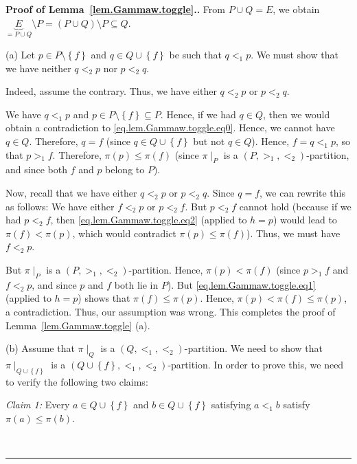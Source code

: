 \documentclass[numbers=enddot,12pt,final,onecolumn,notitlepage,abstracton]{scrartcl}%
\theoremstyle{definition}
\newenvironment{proof}[1][Proof]{\noindent\textbf{#1.} }{\ \rule{0.5em}{0.5em}}
\begin{document}
\begin{proof}[Proof of Lemma~\ref{lem.Gammaw.toggle}.]From
$P \cup Q = E$, we obtain $\underbrace{E}_{= P \cup Q}
\setminus P = \left(P \cup Q\right) \setminus P \subseteq Q$.

(a) Let $p \in P \setminus \left\{f\right\}$
and $q \in Q \cup \left\{f\right\}$ be such that
$q <_1 p$. We must show that we have neither $q <_2 p$ nor $p <_2 q$.

Indeed, assume the contrary. Thus, we have
either $q <_2 p$ or $p <_2 q$.

We have $q <_{1} p$ and
$p\in P\setminus\left\{  f\right\}  \subseteq P$. Hence, if we had $q\in Q$,
then we would obtain a contradiction to
\eqref{eq.lem.Gammaw.toggle.eq0}. Hence, we cannot have $q\in Q$.
Therefore, $q=f$ (since $q\in Q\cup\left\{  f\right\}  $ but not $q\in Q$).
Hence, $f=q<_{1}p$, so that $p>_{1}f$. Therefore, $\pi\left(  p\right)
\leq\pi\left(  f\right)  $ (since $\pi\mid_{P}$ is a
$\left(  P,>_{1},<_{2}\right)  $-partition, and since both $f$
and $p$ belong to $P$).

Now, recall that we have either $q <_2 p$ or $p <_2 q$.
Since $q = f$, we can rewrite this as follows:
We have either $f <_2 p$ or $p <_2 f$.
But $p<_{2}f$ cannot hold (because if we had $p<_{2}f$, then
\eqref{eq.lem.Gammaw.toggle.eq2} (applied to $h=p$) would lead to
$\pi\left(  f\right)  <\pi\left(  p\right)  $, which would contradict
$\pi\left(  p\right)  \leq\pi\left(  f\right)  $).
Thus, we must have $f<_{2}p$.

But $\pi\mid_{P}$ is a $\left(  P,>_{1},<_{2}\right)  $-partition. Hence,
$\pi\left(  p\right)  <\pi\left(  f\right)  $ (since $p>_{1}f$ and $f<_{2}p$,
and since $p$ and $f$ both lie in $P$).
But \eqref{eq.lem.Gammaw.toggle.eq1} (applied to $h=p$) shows that
$\pi\left(  f\right)  \leq\pi\left(  p\right)  $. Hence, $\pi\left(  p\right)
<\pi\left(  f\right)  \leq\pi\left(  p\right)  $, a contradiction. Thus, our
assumption was wrong. This completes the proof of
Lemma~\ref{lem.Gammaw.toggle} (a).

(b) Assume that $\pi \mid_Q$ is a $\left(Q, <_1, <_2\right)$-partition. We need
to show that
$\pi \mid_{Q \cup \left\{f\right\}}$ is a
$\left(Q \cup \left\{f\right\}, <_1, <_2\right)$-partition.
In order
to prove this, we need to verify the following two claims:

\textit{Claim 1:} Every $a\in Q\cup\left\{  f\right\}  $ and $b\in
Q\cup\left\{  f\right\}  $ satisfying $a<_{1}b$ satisfy $\pi\left(  a\right)
\leq\pi\left(  b\right)  $.


\end{proof}
\end{document}

